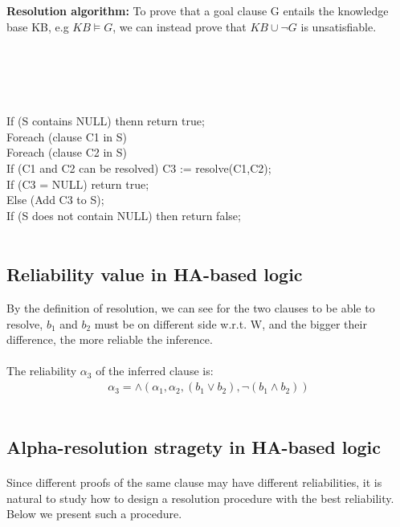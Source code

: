 \documentclass[26pt,fleqn,]{article}
\begin{document}
{\bfseries Resolution algorithm:} 
 To prove that a goal clause G entails the knowledge base KB, e.g \(KB \models G\), we can instead prove
that \(KB \cup \neg G\) is unsatisfiable.\\\\
\\
\\\\
\\
\indent If (S contains NULL) thenn return true;\\
\indent Foreach (clause C1 in S)\\
\indent \indent Foreach (clause C2 in S)\\
\indent \indent \indent If (C1 and C2 can be resolved) C3 := resolve(C1,C2);\\
\indent \indent \indent If (C3 = NULL) return true;\\
\indent \indent \indent Else (Add C3 to S);\\
\indent If (S does not contain NULL) then return false;\\
\\


\subsection{Reliability value in HA-based logic}
By the definition of resolution, we can see for the two clauses to be able to resolve, \(b_1\) and 
\(b_2\) must be on different side w.r.t. W, and the bigger their difference, the more reliable the 
inference.\\\\
The reliability \({\alpha}_3\) of the inferred clause is:\\
\begin{align*}
	{\alpha}_3 = \wedge({\alpha}_1, {\alpha}_2, (b_1 \vee b_2), \neg(b_1 \wedge b_2))
\end{align*}
\\
\subsection{Alpha-resolution stragety in HA-based logic}
\paragraph{} Since different proofs of the same clause may have different reliabilities, 
it is natural to study how to design a resolution procedure with the best reliability. 
Below we present such a procedure.
\end{document}
